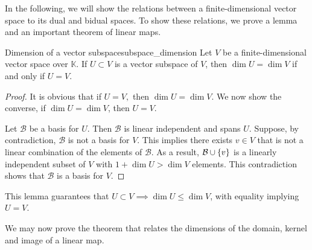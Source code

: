 In the following, we will show the relations between a finite-dimensional vector space to its dual and bidual spaces. To show these relations, we prove a lemma and an important theorem of linear maps.

\begin{lemma}{Dimension of a vector subspace}{subspace_dimension}
    Let \(V\) be a finite-dimensional vector space over \(\mathbb{K}\). If \(U \subset V\) is a vector subspace of \(V\), then \(\dim U = \dim V\) if and only if \(U = V\).
\end{lemma}
\begin{proof}
    It is obvious that if \(U = V,\) then \(\dim U = \dim V\). We now show the converse, if \(\dim U = \dim V\), then \(U = V\).

    Let \(\mathcal{B}\) be a basis for \(U\). Then \(\mathcal{B}\) is linear independent and spans \(U\). Suppose, by contradiction, \(\mathcal{B}\) is not a basis for \(V\). This implies there exists \(v \in V\) that is not a linear combination of the elements of \(\mathcal{B}\). As a result, \(\mathcal{B} \cup \{v\}\) is a linearly independent subset of \(V\) with \(1 + \dim U > \dim V\) elements. This contradiction shows that \(\mathcal{B}\) is a basis for \(V\).
\end{proof}
\begin{remark}
    This lemma guarantees that \(U \subset V \implies \dim U \leq \dim V\), with equality implying \(U = V\).
\end{remark}

We may now prove the theorem that relates the dimensions of the domain, kernel and image of a linear map.


